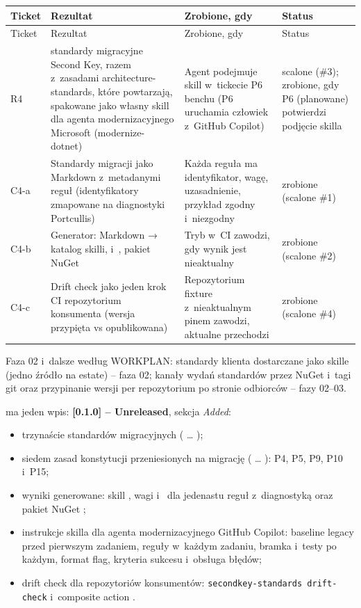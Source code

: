 \begin{xltabular}{\linewidth}{@{}>{\raggedright\arraybackslash}p{1.1cm} >{\raggedright\arraybackslash}X >{\raggedright\arraybackslash}X >{\raggedright\arraybackslash}p{3.3cm}@{}}
\toprule
Ticket & Rezultat & Zrobione, gdy & Status \\
\midrule
\endfirsthead
\toprule
Ticket & Rezultat & Zrobione, gdy & Status \\
\midrule
\endhead
R4 & standardy migracyjne Second Key, razem z~zasadami architecture-standards, które powtarzają, spakowane jako własny skill dla agenta modernizacyjnego Microsoft (modernize-dotnet) & Agent podejmuje skill w~tickecie P6 benchu (P6 uruchamia człowiek z~GitHub Copilot) & scalone (\#3); zrobione, gdy P6 (planowane) potwierdzi podjęcie skilla \\
C4-a & Standardy migracji jako Markdown z~metadanymi reguł (identyfikatory zmapowane na diagnostyki Portcullis) & Każda reguła ma identyfikator, wagę, uzasadnienie, przykład zgodny i~niezgodny & zrobione (scalone \#1) \\
C4-b & Generator: Markdown → katalog skilli,  i~, pakiet NuGet & Tryb  w~CI zawodzi, gdy wynik jest nieaktualny & zrobione (scalone \#2) \\
C4-c & Drift check jako jeden krok CI repozytorium konsumenta (wersja przypięta vs opublikowana) & Repozytorium fixture z~nieaktualnym pinem zawodzi, aktualne przechodzi & zrobione (scalone \#4) \\
\bottomrule
\end{xltabular}

Faza 02 i~dalsze według WORKPLAN: standardy klienta dostarczane jako skille (jedno źródło na
estate) -- faza 02; kanały wydań standardów przez NuGet i~tagi git oraz przypinanie wersji
per repozytorium po stronie odbiorców -- fazy 02--03.

 ma jeden wpis: \textbf{[0.1.0] -- Unreleased}, sekcja \emph{Added}:
\begin{itemize}
  \item trzynaście standardów migracyjnych ( … );
  \item siedem zasad konstytucji przeniesionych na migrację ( …
        ): P4, P5, P9, P10 i~P15;
  \item wyniki generowane: skill , wagi
         i~ dla jedenastu reguł z~diagnostyką
        oraz pakiet NuGet ;
  \item instrukcje skilla dla agenta modernizacyjnego GitHub Copilot: baseline legacy przed
        pierwszym zadaniem, reguły w~każdym zadaniu, bramka i~testy po każdym, format flag,
        kryteria sukcesu i~obsługa błędów;
  \item drift check dla repozytoriów konsumentów: \texttt{secondkey-standards drift-check}
        i~composite action .
\end{itemize}

